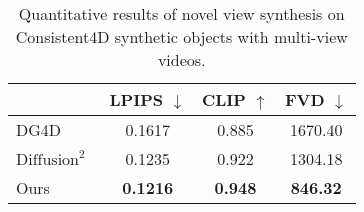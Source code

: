 \begin{wraptable}{l}{0.6\textwidth}
\vspace{-10pt}

\caption{Quantitative results of novel view synthesis on Consistent4D synthetic objects with multi-view videos. }
\vspace{1pt}
\setlength{\tabcolsep}{0.25em} %
\centering
\begin{tabular}{lccc}
\toprule
 & LPIPS $\downarrow$ & CLIP $\uparrow$ & FVD $\downarrow$    \\
\midrule
DG4D~\cite{ren2023dreamgaussian4d} & 0.1617 & 0.885 & 1670.40  \\
$\text{Diffusion}^2$~\cite{yang2024diffusion} & 0.1235 & 0.922 & 1304.18  \\
Ours & \textbf{0.1216} &  \textbf{0.948} & \textbf{846.32}  \\
\bottomrule
\end{tabular}%
\label{tab:exp_novel_view}

\vspace{3pt}

\end{wraptable}